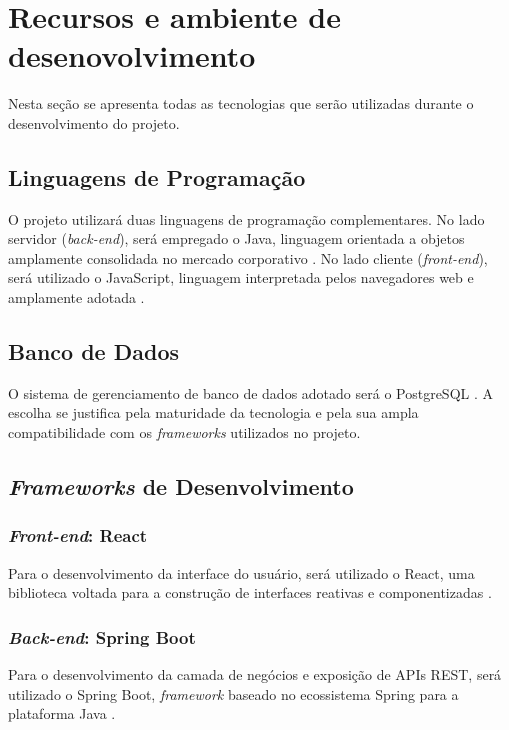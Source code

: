 \chapter{Recursos e ambiente de desenovolvimento}\label{sec:5}

Nesta seção se apresenta todas as tecnologias que serão utilizadas durante o desenvolvimento do projeto. 

\section{Linguagens de Programação}

O projeto utilizará duas linguagens de programação complementares. No lado 
servidor (\textit{back-end}), será empregado o Java, linguagem 
orientada a objetos amplamente consolidada no mercado corporativo \cite{Oracle2025}. No lado 
cliente (\textit{front-end}), será utilizado o JavaScript, linguagem 
interpretada pelos navegadores web e amplamente adotada \cite{Guo2025}.

\section{Banco de Dados}

O sistema de gerenciamento de banco de dados adotado será o 
PostgreSQL \cite{PostgreSQLGlobalDevelopmentGroup2025}. A escolha se justifica pela maturidade da tecnologia e pela sua 
ampla compatibilidade com os \textit{frameworks} utilizados no projeto.

\section{\textit{Frameworks} de Desenvolvimento}

\subsection{\textit{Front-end}: React}

Para o desenvolvimento da interface do usuário, será utilizado o 
React, uma biblioteca voltada para a construção de interfaces reativas e componentizadas \cite{ReactTeam2025}. 

\subsection{\textit{Back-end}: Spring Boot}

Para o desenvolvimento da camada de negócios e exposição de APIs REST, será 
utilizado o Spring Boot, \textit{framework} baseado no ecossistema 
Spring para a plataforma Java \cite{Webb2025}.